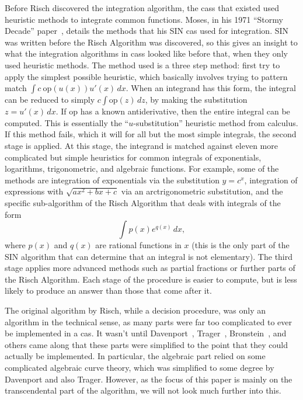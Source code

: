 Before Risch discovered the \gls{integration} algorithm, the \glspl{cas}
that existed used heuristic methods to integrate common functions.
Moses, in his 1971 ``Stormy Decade'' paper~\cite{moses1971symbolic},
details the methods that his SIN \gls{cas} used for integration. SIN was
written before the Risch Algorithm was discovered, so this gives an
insight to what the integration algorithms in \glspl{cas} looked like
before that, when they only used heuristic methods.  The method used is
a three step method: first try to apply the simplest possible heuristic,
which basically involves trying to pattern match $\int{c\
\mathrm{op}(u(x))u'(x)\,dx}$. When an \gls{integrand} has this form, the
integral can be reduced to simply $c\int{\mathrm{op}(z)\,dz}$, by making
the substitution $z=u'(x)\,dx$.  If $\mathrm{op}$ has a known
antiderivative, then the entire integral can be computed.  This is
essentially the ``$u$-substitution'' heuristic method from calculus.  If
this method fails, which it will for all but the most simple integrals,
the second stage is applied.  At this stage, the \gls{integrand} is
matched against eleven more complicated but simple heuristics for common
integrals of exponentials, logarithms, trigonometric, and
\gls{algebraic} functions.  For example, some of the methods are
\gls{integration} of exponentials via the substitution $y=c^x$,
integration of expressions with $\sqrt{ax^2 + bx + c}$ via an
arctrigonometric substitution, and the specific sub-algorithm of the
Risch Algorithm that deals with integrals of the form
\begin{equation}
\label{SIN exponential form}
\int{p(x)e^{q(x)}\,dx},
\end{equation}
where $p(x)$ and $q(x)$ are \glspl{rational function} in $x$ (this is
the only part of the SIN algorithm that can determine that an integral
is not \gls{elementary}). The third stage applies more advanced methods
such as partial fractions or further parts of the Risch Algorithm.  Each
stage of the procedure is easier to compute, but is less likely to
produce an answer than those that come after it.

The original algorithm by Risch, while a decision procedure, was only an
algorithm in the technical sense, as many parts were far too complicated
to ever be implemented in a \gls{cas}.  It wasn't until
Davenport~\cite{davenport1984integration},
Trager~\cite{trager1984integration},
Bronstein~\cite{bronstein2005symbolic}, and others came along that these
parts were simplified to the point that they could actually be
implemented.  In particular, the \gls{algebraic} part relied on some
complicated algebraic curve theory, which was simplified to some degree
by Davenport and also Trager.  However, as the focus of this paper is
mainly on the \gls{transcendental} part of the algorithm, we will not
look much further into this.  